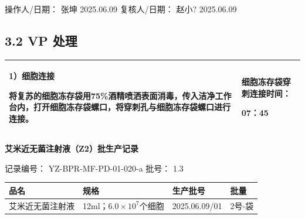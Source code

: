 \documentclass[UTF8,10pt,a4paper,fontset=fandol]{ctexart}
\newcommand{\fieldvalue}[1]{#1}
\newcommand{\handwritten}[1]{#1}
\begin{document}
操作人/日期：
\fieldvalue{\handwritten{张坤}}
\quad
\fieldvalue{\handwritten{2025.06.09}}
\hfill
复核人/日期：
\fieldvalue{\handwritten{赵小?}}
\quad
\fieldvalue{\handwritten{2025.06.09}}

\subsection*{3.2 VP 处理}

\begin{tabularx}{\textwidth}{|p{}|X|}
\hline
1）细胞连接

将复苏的细胞冻存袋用75\%酒精喷洒表面消毒，传入洁净工作台内，打开细胞冻存袋螺口，将穿刺孔与细胞冻存袋螺口进行连接。 &
细胞冻存袋穿刺连接时间：

\fieldvalue{\handwritten{07：45}}\\
\hline
\end{tabularx}


\newpage

\begin{center}
{\Large \textbf{艾米近无菌注射液（Z2）批生产记录}}
\end{center}

\noindent
记录编号：
\fieldvalue{YZ-BPR-MF-PD-01-020-a}
\hfill
批号：
\fieldvalue{1.3}

\begin{tabularx}{\textwidth}{|>{\centering\arraybackslash}p{}|X|>{\centering\arraybackslash}p{}|X|}
\hline
品名 & 规格 & 生产批号 & 批量 \\
\hline
艾米近无菌注射液 & 12ml；$6.0\times10^7$个细胞 &
\fieldvalue{\handwritten{2025.06.09/01}} &
\fieldvalue{\handwritten{2号-袋}} \\
\hline
\end{tabularx}
\end{document}
